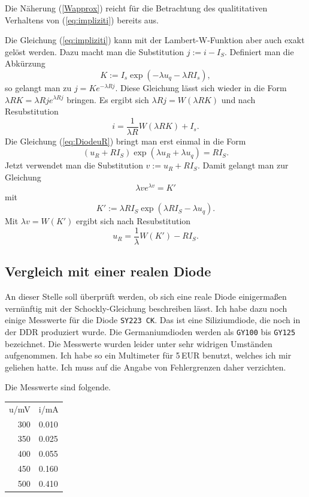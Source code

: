\documentclass[a4paper,10pt,fleqn,twocolumn,twoside]{article}
\numberwithin{equation}{section}
\begin{document}
Die Näherung (\ref{Wapprox}) reicht für die Betrachtung des
qualititativen Verhaltens von (\ref{eq:impliziti}) bereits aus.

Die Gleichung (\ref{eq:impliziti}) kann mit der Lambert-W-Funktion
aber auch exakt gelöst werden. Dazu macht man die Substitution
$j:=i-I_S$. Definiert man die Abkürzung
\begin{equation}
K:=I_s\exp(-\lambda u_q-\lambda RI_s),
\end{equation}
so gelangt man zu $j=Ke^{-\lambda Rj}$. Diese Gleichung lässt sich
wieder in die Form $\lambda RK=\lambda Rje^{\lambda Rj}$
bringen. Es ergibt sich $\lambda Rj=W(\lambda RK)$ und
nach Resubstitution
\begin{equation}
i = \frac{1}{\lambda R}W(\lambda RK)+I_s.
\end{equation}
Die Gleichung (\ref{eq:DiodeuR}) bringt man erst einmal in die
Form
\begin{equation}
(u_R+RI_S)\exp(\lambda u_R+\lambda u_q) = RI_S.
\end{equation}
Jetzt verwendet man die Substitution
$v:=u_R+RI_S$. Damit gelangt man zur Gleichung
\begin{equation}
\lambda ve^{\lambda v}=K'
\end{equation}
mit
\begin{equation}
K':=\lambda RI_S\exp(\lambda RI_S-\lambda u_q).
\end{equation}
Mit $\lambda v=W(K')$ ergibt sich nach Resubstitution
\begin{equation}
u_R = \frac{1}{\lambda} W(K')-RI_S.
\end{equation}

\subsection{Vergleich mit einer realen Diode}
An dieser Stelle soll überprüft werden, ob sich eine
reale Diode einigermaßen vernünftig mit der Schockly-Gleichung
beschreiben lässt. Ich habe dazu noch einige Messwerte für
die Diode \texttt{SY223 CK}. Das ist eine Siliziumdiode, die noch
in der DDR produziert wurde. Die Germaniumdioden werden als
\texttt{GY100} bis \texttt{GY125} bezeichnet. Die Messwerte wurden
leider unter sehr widrigen Umständen aufgenommen. Ich habe so ein
Multimeter für 5\,EUR benutzt, welches ich mir geliehen hatte.
Ich muss auf die Angabe von Fehlergrenzen daher verzichten.

Die Messwerte sind folgende.

\begin{tt}
\begin{tabular}{r|l}
u/mV & i/mA\\
300 & 0.010\\
350 & 0.025\\
400 & 0.055\\
450 & 0.160\\
500 & 0.410
\end{tabular}
\end{tt}
\end{document}
